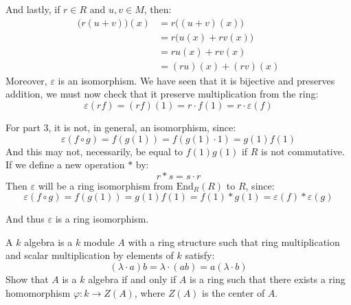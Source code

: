 \documentclass[crop=false,class=article]{standalone}                           %
\begin{document}
\begin{solution}
            And lastly, if $r\in{R}$ and $u,v\in{M}$, then:
            \begin{subequations}
                \begin{align}
                    \big(r(u+v)\big)(x)
                    &=r\big((u+v)(x)\big)\\
                    &=r\big(u(x)+rv(x)\big)\\
                    &=ru(x)+rv(x)\\
                    &=(ru)(x)+(rv)(x)
                \end{align}
            \end{subequations}
            Moreover, $\varepsilon$ is an isomorphism. We have seen that
            it is bijective and preserves addition, we must now check
            that it preserve multiplication from the ring:
            \begin{equation}
                \varepsilon(rf)
                =(rf)(1)
                =r\cdot{f}(1)
                =r\cdot\varepsilon(f)
            \end{equation}
            \par\hfill\par
            For part 3, it is not, in general, an isomorphism, since:
            \begin{equation}
                \varepsilon(f\circ{g})
                =f(g(1))
                =f(g(1)\cdot{1})
                =g(1)f(1)
            \end{equation}
            And this may not, necessarily, be equal to $f(1)g(1)$ if
            $R$ is not commutative. If we define a new operation
            $*$ by:
            \begin{equation}
                r*s=s\cdot{r}
            \end{equation}
            Then $\varepsilon$ will be a ring isomorphism from
            $\textrm{End}_{R}(R)$ to $R$, since:
            \begin{equation}
                \varepsilon(f\circ{g})=
                f(g(1))=g(1)f(1)=f(1)*g(1)
                =\varepsilon(f)*\varepsilon(g)
            \end{equation}
        \end{solution}
        And thus $\varepsilon$ is a ring isomorphism.
    \begin{problem}
        A $k$ algebra is a $k$ module $A$ with a ring structure such
        that ring multiplication and scalar multiplication by elements
        of $k$ satisfy:
        \begin{equation}
            (\lambda\cdot{a})b=\lambda\cdot(ab)=a(\lambda\cdot{b})
        \end{equation}
        Show that $A$ is a $k$ algebra if and only if $A$ is a ring such
        that there exists a ring homomorphism $\varphi:k\rightarrow{Z}(A)$,
        where $Z(A)$ is the center of $A$.
    \end{problem}
\end{document}
